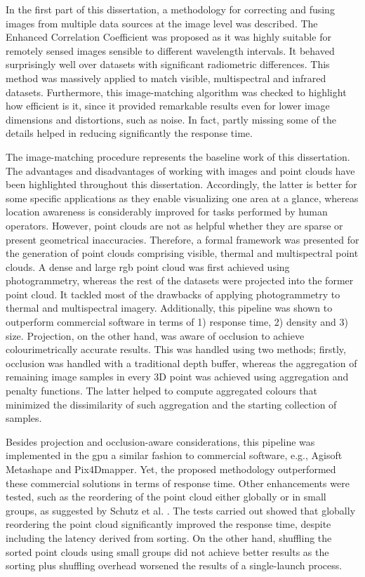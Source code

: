 In the first part of this dissertation, a methodology for correcting and fusing images from multiple data sources at the image level was described. The Enhanced Correlation Coefficient was proposed as it was highly suitable for remotely sensed images sensible to different wavelength intervals. It behaved surprisingly well over datasets with significant radiometric differences. This method was massively applied to match visible, multispectral and infrared datasets. Furthermore, this image-matching algorithm was checked to highlight how efficient is it, since it provided remarkable results even for lower image dimensions and distortions, such as noise. In fact, partly missing some of the details helped in reducing significantly the response time. 

The image-matching procedure represents the baseline work of this dissertation. The advantages and disadvantages of working with images and point clouds have been highlighted throughout this dissertation. Accordingly, the latter is better for some specific applications as they enable visualizing one area at a glance, whereas location awareness is considerably improved for tasks performed by human operators. However, point clouds are not as helpful whether they are sparse or present geometrical inaccuracies. Therefore, a formal framework was presented for the generation of point clouds comprising visible, thermal and multispectral point clouds. A dense and large \acrshort{rgb} point cloud was first achieved using photogrammetry, whereas the rest of the datasets were projected into the former point cloud. It tackled most of the drawbacks of applying photogrammetry to thermal and multispectral imagery. Additionally, this pipeline was shown to outperform commercial software in terms of 1) response time, 2) density and 3) size. Projection, on the other hand, was aware of occlusion to achieve colourimetrically accurate results. This was handled using two methods; firstly, occlusion was handled with a traditional depth buffer, whereas the aggregation of remaining image samples in every 3D point was achieved using aggregation and penalty functions. The latter helped to compute aggregated colours that minimized the dissimilarity of such aggregation and the starting collection of samples. 

Besides projection and occlusion-aware considerations, this pipeline was implemented in the \acrshort{gpu} a similar fashion to commercial software, e.g., Agisoft Metashape and Pix4Dmapper. Yet, the proposed methodology outperformed these commercial solutions in terms of response time. Other enhancements were tested, such as the reordering of the point cloud either globally or in small groups, as suggested by Schutz et al. \cite{schutz_rendering_2021}. The tests carried out showed that globally reordering the point cloud significantly improved the response time, despite including the latency derived from sorting. On the other hand, shuffling the sorted point clouds using small groups did not achieve better results as the sorting plus shuffling overhead worsened the results of a single-launch process. 


